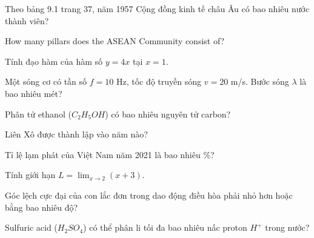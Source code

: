 \begin{ex}
    Theo bảng 9.1 trang 37, năm 1957 Cộng đồng kinh tế châu Âu có bao nhiêu nước thành viên?
\end{ex}
\begin{ex}
    How many pillars does the ASEAN Community consist of?
\end{ex}
\begin{ex}
    Tính đạo hàm của hàm số $y = 4x$ tại $x=1$.
\end{ex}
\begin{ex}
    Một sóng cơ có tần số $f = 10$ Hz, tốc độ truyền sóng $v = 20$ m/s. Bước sóng $\lambda$ là bao nhiêu mét?
\end{ex}
\begin{ex}
    Phân tử ethanol ($C_2H_5OH$) có bao nhiêu nguyên tử carbon?
\end{ex}
\begin{ex}
    Liên Xô được thành lập vào năm nào?
\end{ex}
\begin{ex}
    Tỉ lệ lạm phát của Việt Nam năm 2021 là bao nhiêu \%?
\end{ex}
\begin{ex}
    Tính giới hạn $L = \lim_{x \to 2} (x + 3)$.
\end{ex}
\begin{ex}
    Góc lệch cực đại của con lắc đơn trong dao động điều hòa phải nhỏ hơn hoặc bằng bao nhiêu độ?
\end{ex}
\begin{ex}
    Sulfuric acid ($H_2SO_4$) có thể phân li tối đa bao nhiêu nấc proton $H^+$ trong nước?
\end{ex}
